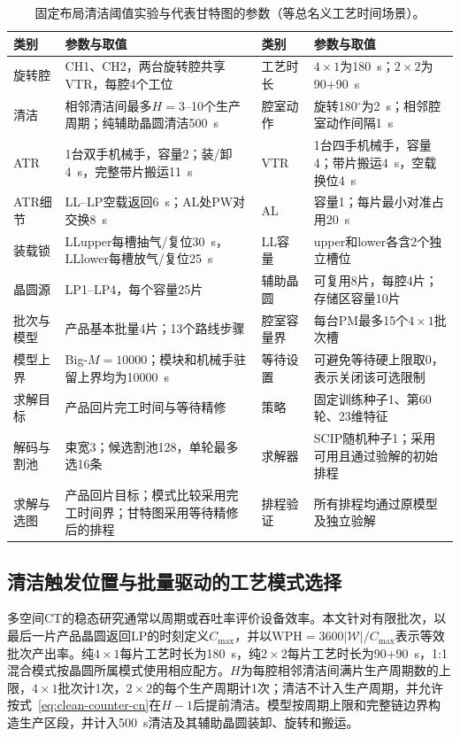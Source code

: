 \documentclass[final,5p,times,twocolumn]{elsarticle}
\begin{document}
\begin{table}[!htbp]
\centering
\scriptsize
\setlength{\tabcolsep}{2pt}
\caption{固定布局清洁阈值实验与代表甘特图的参数（等总名义工艺时间场景）。}
\label{tab:gantt-config-zh}
\begin{tabular}{C{0.10\textwidth} C{0.29\textwidth} C{0.10\textwidth} C{0.29\textwidth}}
\toprule
类别 & 参数与取值 & 类别 & 参数与取值\\
\midrule
旋转腔 & CH1、CH2，两台旋转腔共享VTR，每腔4个工位 & 工艺时长 & $4\times1$为180~s；$2\times2$为90+90~s\\
清洁 & 相邻清洁间最多$H=3$--10个生产周期；纯辅助晶圆清洁500~s & 腔室动作 & 旋转180$^\circ$为2~s；相邻腔室动作间隔1~s\\
ATR & 1台双手机械手，容量2；装/卸4~s，完整带片搬运11~s & VTR & 1台四手机械手，容量4；带片搬运4~s，空载换位4~s\\
ATR细节 & LL--LP空载返回6~s；AL处PW对交换8~s & AL & 容量1；每片最小对准占用20~s\\
装载锁 & LLupper每槽抽气/复位30~s，LLlower每槽放气/复位25~s & LL容量 & upper和lower各含2个独立槽位\\
晶圆源 & LP1--LP4，每个容量25片 & 辅助晶圆 & 可复用8片，每腔4片；存储区容量10片\\
批次与模型 & 产品基本批量4片；13个路线步骤 & 腔室容量界 & 每台PM最多15个$4\times1$批次槽\\
模型上界 & Big-$M=10000$；模块和机械手驻留上界均为10000~s & 等待设置 & 可避免等待硬上限取0，表示关闭该可选限制\\
求解目标 & 产品回片完工时间与等待精修 & 策略 & 固定训练种子1、第60轮、23维特征\\
解码与割池 & 束宽3；候选割池128，单轮最多选16条 & 求解器 & SCIP随机种子1；采用可用且通过验解的初始排程\\
求解与选图 & 产品回片目标；模式比较采用完工时间界；甘特图采用等待精修后的排程 & 排程验证 & 所有排程均通过原模型及独立验解\\
\bottomrule
\end{tabular}
\end{table}

\subsection{清洁触发位置与批量驱动的工艺模式选择}

多空间CT的稳态研究通常以周期或吞吐率评价设备效率\citep{gu2024multifinger}。本文针对有限批次，以最后一片产品晶圆返回LP的时刻定义$C_{\max}$，并以$\mathrm{WPH}=3600|\mathcal W|/C_{\max}$表示等效批次产出率。纯$4\times1$每片工艺时长为180~s，纯$2\times2$每片工艺时长为90+90~s，1:1混合模式按晶圆所属模式使用相应配方。$H$为每腔相邻清洁间满片生产周期数的上限，$4\times1$批次计1次，$2\times2$的每个生产周期计1次；清洁不计入生产周期，并允许按式~\eqref{eq:clean-counter-cn}在$H-1$后提前清洁。模型按周期上限和完整链边界构造生产区段，并计入500~s清洁及其辅助晶圆装卸、旋转和搬运。
\end{document}

